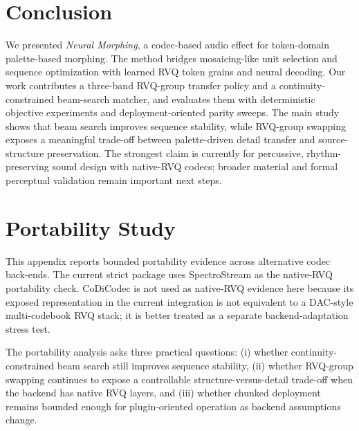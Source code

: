 \documentclass[twoside,a4paper]{article}
\begin{document}
\section{Conclusion}
We presented \emph{Neural Morphing}, a codec-based audio effect for token-domain palette-based morphing. The method bridges mosaicing-like unit selection and sequence optimization with learned RVQ token grains and neural decoding. Our work contributes a three-band RVQ-group transfer policy and a continuity-constrained beam-search matcher, and evaluates them with deterministic objective experiments and deployment-oriented parity sweeps. The main study shows that beam search improves sequence stability, while RVQ-group swapping exposes a meaningful trade-off between palette-driven detail transfer and source-structure preservation. The strongest claim is currently for percussive, rhythm-preserving sound design with native-RVQ codecs; broader material and formal perceptual validation remain important next steps.





\appendix

\section{Portability Study}\label{sec:app-portability}

This appendix reports bounded portability evidence across alternative codec back-ends. The current strict package uses SpectroStream \cite{Li:2025:SpectroStream} as the native-RVQ portability check. CoDiCodec \cite{Pasini:2025:CoDiCodec} is not used as native-RVQ evidence here because its exposed representation in the current integration is not equivalent to a DAC-style multi-codebook RVQ stack; it is better treated as a separate backend-adaptation stress test.

The portability analysis asks three practical questions: (i) whether continuity-constrained beam search still improves sequence stability, (ii) whether RVQ-group swapping continues to expose a controllable structure-versus-detail trade-off when the backend has native RVQ layers, and (iii) whether chunked deployment remains bounded enough for plugin-oriented operation as backend assumptions change.
\end{document}
